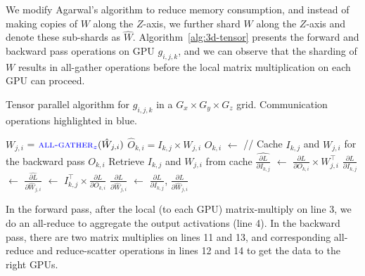 We modify Agarwal's algorithm to reduce memory consumption, and instead of
making copies of $W$ along the $Z$-axis, we further shard $W$ along the
$Z$-axis and denote these sub-shards as $\hat{W}$.
Algorithm~\ref{alg:3d-tensor} presents the forward and backward pass operations
on GPU $g_{i,j,k}$, and we can observe that the sharding of $W$ results in
all-gather operations before the local matrix multiplication on each GPU can proceed.

\begin{algorithm}[h]
    {\small 
    \caption{Tensor parallel algorithm for ${g}_{i,j,k}$ in a $G_{x} \times
G_{y} \times G_{z}$ grid. Communication operations highlighted in blue.} 
    \label{alg:3d-tensor}
    \begin{algorithmic}[1]
    \setlength{\lineskip}{5pt}
        \State  $W_{j,i}$ = $\Call{\comm{${\text{all-gather}}_{z}$}}{\hat{W}_{j,i}}$
        \State  $\hat{O}_{k,i} = I_{k,j} \times {W}_{j,i}$
        \State $O_{k,i}$ $\gets$ 
        \State // Cache $I_{k,j}$ and $W_{j,i}$  for the backward pass
        \State \Return $O_{k,i}$
    \EndFunction
    \State
        \State Retrieve  $I_{k,j}$ and $W_{j,i}$  from cache 
        \State $\hat{\frac{\partial L}{\partial I_{k,j}}}$ $\gets$ $\frac{\partial L}{\partial O_{k,i}} \times {W}^{\top}_{j,i}  $
        \State $\frac{\partial L}{\partial I_{k,j}}$ $\gets$ 
        \State ${\frac{\hat{\partial L}}{\partial \hat{W}_{j,i}}}$ $\gets$ $ I^{\top}_{k,j}  \times {\frac{\partial L}{\partial O_{k,i}}} $
        \State ${\frac{\partial L}{\partial \hat{W}_{j,i}}}$ $\gets$ 
        \State \Return $\frac{\partial L}{\partial I_{k,j}}$, ${\frac{\partial L}{\partial \hat{W}_{j,i}}}$
    \EndFunction
    \end{algorithmic}
    }
\end{algorithm}

In the forward pass, after the local (to each GPU) matrix-multiply on line 3,
we do an all-reduce to aggregate the output activations (line 4). In the
backward pass, there are two matrix multiplies on lines 11 and 13, and
corresponding all-reduce and reduce-scatter operations in lines 12 and 14 to
get the data to the right GPUs.


